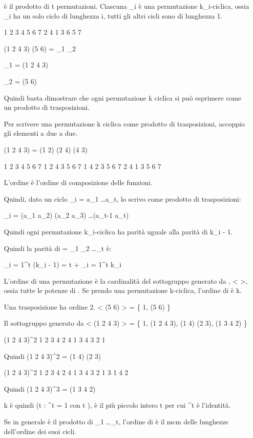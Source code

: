 \sigma \`e il prodotto di t permutazioni. Ciascuna \mu_i \`e una permutazione k_i-ciclica, ossia \mu_i ha un solo ciclo di lunghezza i, tutti gli altri cicli sono di lunghezza 1.

1 2 3 4 5 6 7
2 4 1 3 6 5 7

(1 2 4 3) (5 6) = \mu_1 \cdot \mu_2

\mu_1 = (1 2 4 3)

\mu_2 = (5 6)

Quindi basta dimostrare che ogni permutazione k ciclica si pu\`o esprimere come un prodotto di trasposizioni.

Per scrivere una permutazione k ciclica come prodotto di trasposizioni, accoppio gli elementi a due a due.

(1 2 4 3) = (1 2) (2 4) (4 3)

1 2 3 4 5 6 7
1 2 4 3 5 6 7
1 4 2 3 5 6 7
2 4 1 3 5 6 7

L'ordine \`e l'ordine di composizione delle funzioni.

Quindi, dato un ciclo \mu_i = a_1 \dots a_t, lo scrivo come prodotto di trasposizioni:

\mu_i = (a_1 a_2) (a_2 a_3) \dots (a_{t-1} a_t)

Quindi ogni permutazione k_i-ciclica ha parit\`a uguale alla parit\`a di k_i - 1.

Quindi la parit\`a di \sigma = \mu_1 \cdot \mu_2 \dots \mu_t \`e:

\sum_{i = 1}^{t} (k_i - 1) = t + \sum_{i = 1}^{t} k_i

L'ordine di una permutazione \sigma \`e la cardinalit\`a del sottogruppo generato da \sigma, < \sigma >, ossia tutte le potenze di \sigma. Se prendo una permutazione \mu k-ciclica, l'ordine di \mu \`e k.

Una trasposizione ha ordine 2. < (5 6) > = \{ 1, (5 6) \}

Il sottogruppo generato da < (1 2 4 3) > = \{ 1, (1 2 4 3), (1 4) (2 3), (1 3 4 2) \}

(1 2 4 3)^2
1 2 3 4
2 4 1 3
4 3 2 1

Quindi (1 2 4 3)^2 = (1 4) (2 3)

(1 2 4 3)^2
1 2 3 4
2 4 1 3
4 3 2 1
3 1 4 2

Quindi (1 2 4 3)^3 = (1 3 4 2)

k \`e quindi \inf (t : \sigma^t = 1 con t ), \`e il pi\`u piccolo intero t per cui \sigma^t \`e l'identit\`a.

Se in generale \sigma \`e il prodotto di \mu_1 \dots \mu_t, l'ordine di \sigma \`e il mcm delle lunghezze dell'ordine dei suoi cicli.

